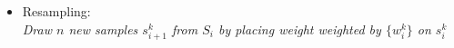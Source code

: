 \begin{itemize}


\item Resampling:\\
	\emph{
	Draw \(n\) new samples \(s^k_{i+1}\) from \(S_i\) by placing
	weight weighted by \(\{w^k_i\}\) on \(s^k_{i}\)
	}
\end{itemize}
